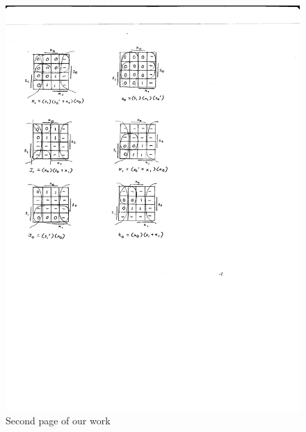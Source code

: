 \documentclass{article}
\begin{document}
\begin{figure}[h!]
\centering
\includegraphics[scale=0.5]{Worksheet(2)}
\caption{Second page of our work}
\end{figure}

\end{document}
